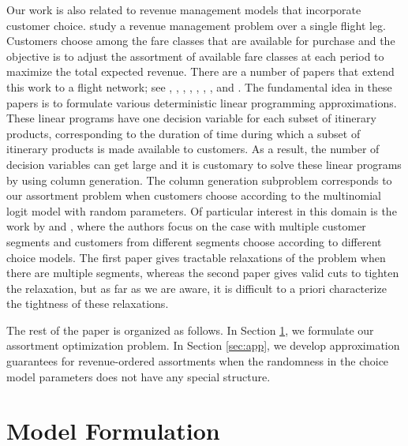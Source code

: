 Our work is also related to revenue management models that incorporate customer choice. \cite{TalluriVanRyzin:2004} study a revenue management problem over a single flight leg. Customers choose among the fare classes that are available for purchase and the objective is to adjust the assortment of available fare classes at each period to maximize the total expected revenue. There are a number of papers that extend this work to a flight network; see \cite{GallegoIPD2004}, \cite{LiuV2008}, \cite{KunnumkalTopaloglu:2008}, \cite{ZhangAdelman:2008}, \cite{Talluri:2010}, \cite{GaRa11}, \cite{MeissnerStrauss:2008}, \cite{VoZh12} and \cite{MeSt12}. The fundamental idea in these papers is to formulate various deterministic linear programming approximations. These linear programs have one decision variable for each subset of itinerary products, corresponding to the duration of time during which a subset of itinerary products is made available to customers. As a result, the number of decision variables can get large and it is customary to solve these linear programs by using column generation. The column generation subproblem corresponds to our  assortment problem when customers choose according to the multinomial logit model with random parameters. Of particular interest in this domain is the work by \cite{Talluri:2010} and \cite{MeSt12}, where the authors focus on the case with multiple customer segments and customers from different segments choose according to different choice models. The first paper gives tractable relaxations of the problem when there are multiple segments, whereas the second paper gives valid cuts to tighten the relaxation, but as far as we are aware, it is difficult to a priori characterize the tightness of these relaxations. 


The rest of the paper is organized as follows. In Section \ref{sec:form}, we formulate our assortment optimization problem. In Section \ref{sec:app}, we develop approximation guarantees for revenue-ordered assortments when the randomness in the choice model parameters does not have any special structure.

\section{Model Formulation}
\label{sec:form}

